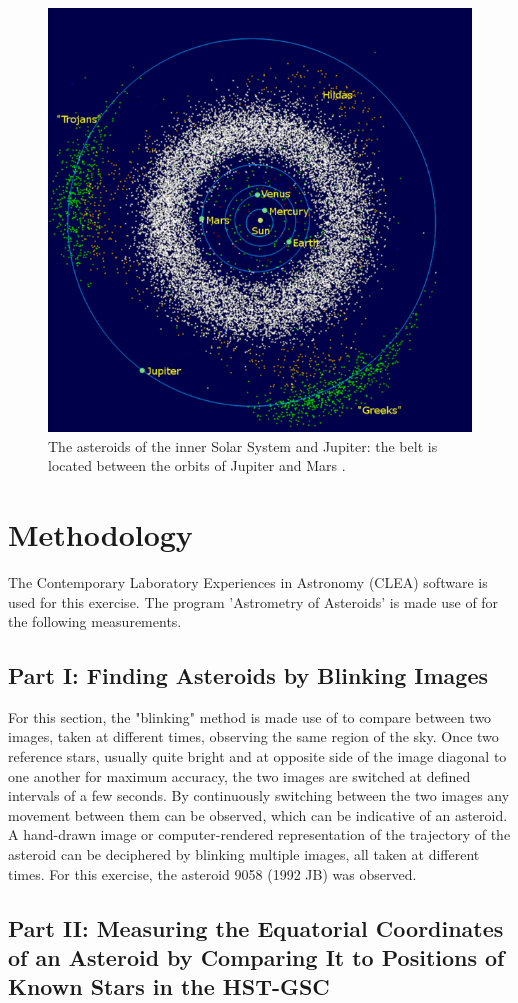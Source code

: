 \documentclass[12pt]{article}
\begin{document}
\begin{figure}[H]
    \centering
    \includegraphics[width=.5\textwidth]{asteroids solar system.png}
    \caption{The asteroids of the inner Solar System and Jupiter: the belt is located between the orbits of Jupiter and Mars \protect\cite{wikiasteroidbelt}.}
    \label{fig:3}
\end{figure}

\newpage

\section{Methodology} \label{sec:2}

The Contemporary Laboratory Experiences in Astronomy (CLEA) software is used for this exercise. The program 'Astrometry of Asteroids' is made use of for the following measurements.

\subsection{Part I: Finding Asteroids by Blinking Images}

For this section, the "blinking" method is made use of to compare between two images, taken at different times, observing the same region of the sky. Once two reference stars, usually quite bright and at opposite side of the image diagonal to one another for maximum accuracy, the 
two images are switched at defined intervals of a few seconds. By continuously switching between the two images any movement between them can be observed, which can be indicative of an asteroid. A hand-drawn image or computer-rendered representation of the trajectory of the asteroid can be deciphered by blinking multiple images,
all taken at different times. For this exercise, the asteroid 9058 (1992 JB) was observed.

\subsection{Part II: Measuring the Equatorial Coordinates of an Asteroid by Comparing It to Positions of Known Stars in the HST-GSC}
\end{document}

